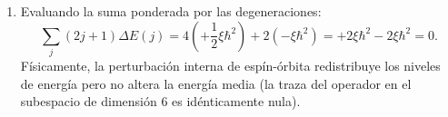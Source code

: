 \begin{appendices}
\begin{enumerate}
\begin{align}
        &= \frac{\xi\hbar^2}{2}\left[ j(j+1) - 2 - \frac{3}{4} \right] = \frac{\xi\hbar^2}{2}\left[ j(j+1) - \frac{11}{4} \right].
    \end{align}
    \begin{itemize}
        \item Para $j = 3/2$: $j(j+1) = \frac{3}{2}\cdot\frac{5}{2} = \frac{15}{4}$, luego:
        \begin{equation}
            \Delta E(^2P_{3/2}) = \frac{\xi\hbar^2}{2}\left( \frac{15}{4} - \frac{11}{4} \right) = \frac{\xi\hbar^2}{2}(1) = +\frac{1}{2}\xi\hbar^2.
        \end{equation}
        \item Para $j = 1/2$: $j(j+1) = \frac{1}{2}\cdot\frac{3}{2} = \frac{3}{4}$, luego:
        \begin{equation}
            \Delta E(^2P_{1/2}) = \frac{\xi\hbar^2}{2}\left( \frac{3}{4} - \frac{11}{4} \right) = \frac{\xi\hbar^2}{2}(-2) = -\xi\hbar^2.
        \end{equation}
    \end{itemize}
    El desdoblamiento energético total resulta ser:
    \begin{equation}
        \Delta E_{\text{fina}} = \Delta E(^2P_{3/2}) - \Delta E(^2P_{1/2}) = \frac{1}{2}\xi\hbar^2 - (-\xi\hbar^2) = \frac{3}{2}\xi\hbar^2.
    \end{equation}
    \item Evaluando la suma ponderada por las degeneraciones:
    \begin{equation}
        \sum_j (2j+1)\Delta E(j) = 4\left(+\frac{1}{2}\xi\hbar^2\right) + 2(-\xi\hbar^2) = +2\xi\hbar^2 - 2\xi\hbar^2 = 0.
    \end{equation}
    Físicamente, la perturbación interna de espín-órbita redistribuye los niveles de energía pero no altera la energía media (la traza del operador en el subespacio de dimensión 6 es idénticamente nula).

\end{enumerate}


\end{appendices}
